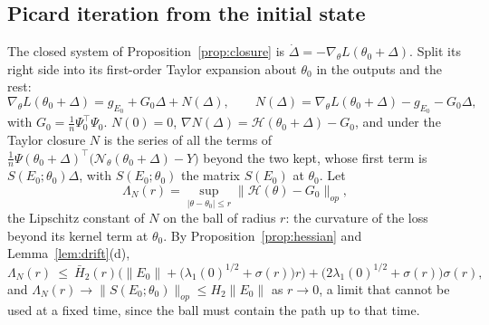 \documentclass[11pt]{article}
\theoremstyle{definition}
\theoremstyle{remark}
\newcommand{\Net}{\mathcal{N}_\theta}    %
\newcommand{\Hess}{\mathcal{H}}          %
\begin{document}
\subsection{Picard iteration from the initial state}

The closed system of Proposition~\ref{prop:closure} is $\dot\Delta = -\nabla_\theta L(\theta_0 + \Delta)$.
Split its right side into its first-order Taylor expansion about $\theta_0$ in the outputs and the rest:
\begin{equation}\label{eq:Nsplit}
\nabla_\theta L(\theta_0 + \Delta) = g_{E_0} + G_0\Delta + N(\Delta),\qquad N(\Delta) = \nabla_\theta L(\theta_0 + \Delta) - g_{E_0} - G_0\Delta ,
\end{equation}
with $G_0 = \frac1n\Psi_0^\top\Psi_0$.
$N(0) = 0$, $\nabla N(\Delta) = \Hess(\theta_0 + \Delta) - G_0$, and under the Taylor closure $N$ is the series of all the terms of $\frac1n\Psi(\theta_0 + \Delta)^\top\big(\Net(\theta_0 + \Delta) - Y\big)$ beyond the two kept, whose first term is $S(E_0;\theta_0)\Delta$, with $S(E_0;\theta_0)$ the matrix $S(E_0)$ at $\theta_0$.
Let
\begin{equation}\label{eq:LambdaN}
\Lambda_N(r) = \sup_{|\theta - \theta_0|\le r}\|\Hess(\theta) - G_0\|_{op},
\end{equation}
the Lipschitz constant of $N$ on the ball of radius $r$: the curvature of the loss beyond its kernel term at $\theta_0$.
By Proposition~\ref{prop:hessian} and Lemma~\ref{lem:drift}(d),
\begin{equation}\label{eq:LambdaNbound}
\Lambda_N(r)\ \le\ \bar H_2(r)\Big(\|E_0\| + \big(\lambda_1(0)^{1/2} + \sigma(r)\big)r\Big) + \big(2\lambda_1(0)^{1/2} + \sigma(r)\big)\sigma(r),
\end{equation}
and $\Lambda_N(r)\to\|S(E_0;\theta_0)\|_{op}\le H_2\|E_0\|$ as $r\to0$, a limit that cannot be used at a fixed time, since the ball must contain the path up to that time.
\end{document}
